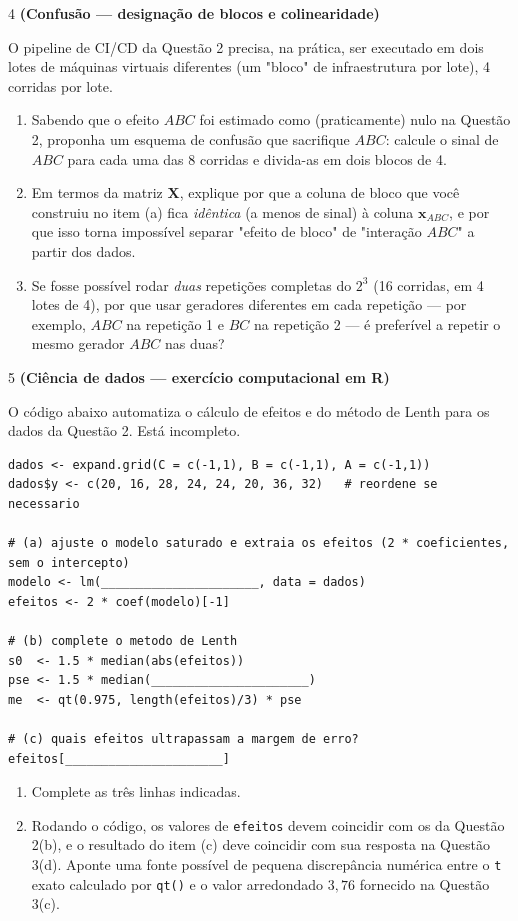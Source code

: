 \documentclass[11pt]{article}
\begin{document}
\begin{questao}{4} \textbf{(Confusão --- designação de blocos e colinearidade)}

O pipeline de CI/CD da Questão 2 precisa, na prática, ser executado em dois lotes de máquinas
virtuais diferentes (um "bloco" de infraestrutura por lote), 4 corridas por lote.

\begin{enumerate}[label=(\alph*)]
  \item Sabendo que o efeito $ABC$ foi estimado como (praticamente) nulo na Questão 2, proponha um
    esquema de confusão que sacrifique $ABC$: calcule o sinal de $ABC$ para cada uma das 8
    corridas e divida-as em dois blocos de 4.
  \item Em termos da matriz $\mathbf{X}$, explique por que a coluna de bloco que você construiu no
    item (a) fica \emph{idêntica} (a menos de sinal) à coluna $\mathbf{x}_{ABC}$, e por que isso
    torna impossível separar "efeito de bloco" de "interação $ABC$" a partir dos dados.
  \item Se fosse possível rodar \emph{duas} repetições completas do $2^3$ (16 corridas, em 4
    lotes de 4), por que usar geradores diferentes em cada repetição --- por exemplo, $ABC$ na
    repetição 1 e $BC$ na repetição 2 --- é preferível a repetir o mesmo gerador $ABC$ nas duas?
\end{enumerate}
\end{questao}

\begin{questao}{5} \textbf{(Ciência de dados --- exercício computacional em R)}

O código abaixo automatiza o cálculo de efeitos e do método de Lenth para os dados da Questão 2.
Está incompleto.

\begin{lstlisting}
dados <- expand.grid(C = c(-1,1), B = c(-1,1), A = c(-1,1))
dados$y <- c(20, 16, 28, 24, 24, 20, 36, 32)   # reordene se necessario

# (a) ajuste o modelo saturado e extraia os efeitos (2 * coeficientes, sem o intercepto)
modelo <- lm(______________________, data = dados)
efeitos <- 2 * coef(modelo)[-1]

# (b) complete o metodo de Lenth
s0  <- 1.5 * median(abs(efeitos))
pse <- 1.5 * median(______________________)
me  <- qt(0.975, length(efeitos)/3) * pse

# (c) quais efeitos ultrapassam a margem de erro?
efeitos[______________________]
\end{lstlisting}

\begin{enumerate}[label=(\alph*)]
  \item Complete as três linhas indicadas.
  \item Rodando o código, os valores de \texttt{efeitos} devem coincidir com os da Questão 2(b), e
    o resultado do item (c) deve coincidir com sua resposta na Questão 3(d). Aponte uma fonte
    possível de pequena discrepância numérica entre o \texttt{t} exato calculado por
    \texttt{qt()} e o valor arredondado $3{,}76$ fornecido na Questão 3(c).
\end{enumerate}
\end{questao}
\end{document}
